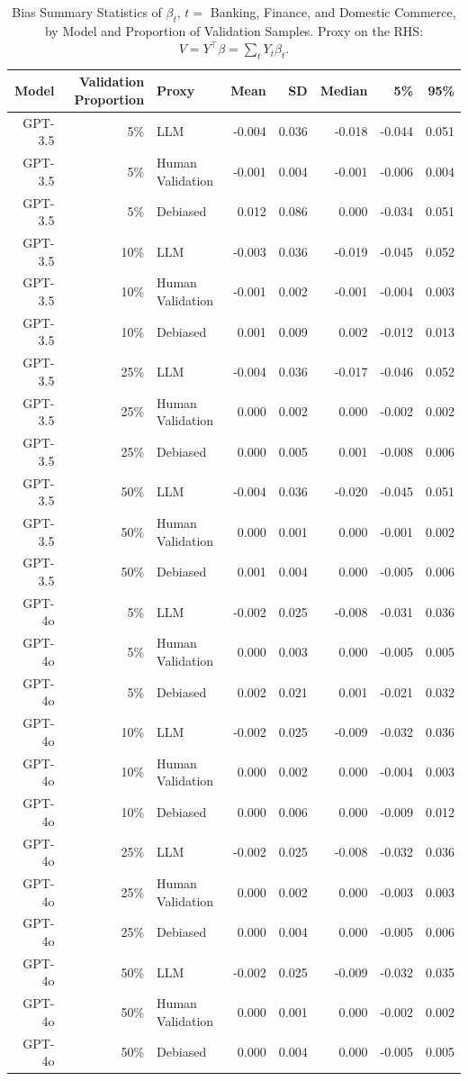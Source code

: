 \begin{table}

\caption{Bias Summary Statistics of $\beta_{t}$, $t=$ Banking, Finance, and Domestic Commerce, by Model and Proportion of Validation Samples.
      Proxy on the RHS: $V = Y^\top \beta = \sum_{t} Y_t \beta_t$.}
\centering
\begin{tabular}[t]{rrlrrrrr}
\toprule
Model & Validation Proportion & Proxy & Mean & SD & Median & 5\% & 95\%\\
\midrule
GPT-3.5 & 5\% & LLM & -0.004 & 0.036 & -0.018 & -0.044 & 0.051\\
GPT-3.5 & 5\% & Human Validation & -0.001 & 0.004 & -0.001 & -0.006 & 0.004\\
GPT-3.5 & 5\% & Debiased & 0.012 & 0.086 & 0.000 & -0.034 & 0.051\\
GPT-3.5 & 10\% & LLM & -0.003 & 0.036 & -0.019 & -0.045 & 0.052\\
GPT-3.5 & 10\% & Human Validation & -0.001 & 0.002 & -0.001 & -0.004 & 0.003\\
GPT-3.5 & 10\% & Debiased & 0.001 & 0.009 & 0.002 & -0.012 & 0.013\\
GPT-3.5 & 25\% & LLM & -0.004 & 0.036 & -0.017 & -0.046 & 0.052\\
GPT-3.5 & 25\% & Human Validation & 0.000 & 0.002 & 0.000 & -0.002 & 0.002\\
GPT-3.5 & 25\% & Debiased & 0.000 & 0.005 & 0.001 & -0.008 & 0.006\\
GPT-3.5 & 50\% & LLM & -0.004 & 0.036 & -0.020 & -0.045 & 0.051\\
GPT-3.5 & 50\% & Human Validation & 0.000 & 0.001 & 0.000 & -0.001 & 0.002\\
GPT-3.5 & 50\% & Debiased & 0.001 & 0.004 & 0.000 & -0.005 & 0.006\\
GPT-4o & 5\% & LLM & -0.002 & 0.025 & -0.008 & -0.031 & 0.036\\
GPT-4o & 5\% & Human Validation & 0.000 & 0.003 & 0.000 & -0.005 & 0.005\\
GPT-4o & 5\% & Debiased & 0.002 & 0.021 & 0.001 & -0.021 & 0.032\\
GPT-4o & 10\% & LLM & -0.002 & 0.025 & -0.009 & -0.032 & 0.036\\
GPT-4o & 10\% & Human Validation & 0.000 & 0.002 & 0.000 & -0.004 & 0.003\\
GPT-4o & 10\% & Debiased & 0.000 & 0.006 & 0.000 & -0.009 & 0.012\\
GPT-4o & 25\% & LLM & -0.002 & 0.025 & -0.008 & -0.032 & 0.036\\
GPT-4o & 25\% & Human Validation & 0.000 & 0.002 & 0.000 & -0.003 & 0.003\\
GPT-4o & 25\% & Debiased & 0.000 & 0.004 & 0.000 & -0.005 & 0.006\\
GPT-4o & 50\% & LLM & -0.002 & 0.025 & -0.009 & -0.032 & 0.035\\
GPT-4o & 50\% & Human Validation & 0.000 & 0.001 & 0.000 & -0.002 & 0.002\\
GPT-4o & 50\% & Debiased & 0.000 & 0.004 & 0.000 & -0.005 & 0.005\\
\bottomrule
\end{tabular}
\end{table}
